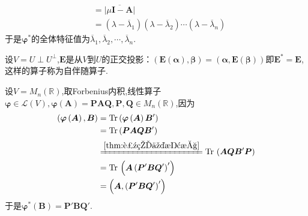 \begin{formal}
\begin{Proof}
\begin{enumerate}[label={\textup{(\arabic*)}}]
\begin{align*}
                &=\overline{
                    \left|
                        \mu\bm{I}-\bm{A}
                    \right|
                }\\
                &=\left(
                    \lambda-\overline{\lambda}_1
                \right)\left(
                    \lambda-\overline{\lambda}_2
                \right)\cdots\left(
                    \lambda-\overline{\lambda}_n
                \right)
            \end{align*}于是$\bm{\varphi}^*$的全体特征值为$\overline{\lambda}_1,\overline{\lambda}_2,\cdots,\overline{\lambda}_n$.\qedhere
        \end{enumerate}
    \end{Proof}
\end{formal}
\begin{brown}
    \begin{example}
        设$V=U\perp U^{\perp}$,$\bm{E}$是从$V$到$U$的正交投影：$\left(\bm{E}\left(\bm{\alpha}\right),\bm{\beta}\right)=\left(\bm{\alpha},\bm{E}\left(\bm{\beta}\right)\right)$即$\bm{E}^*=\bm{E}$,这样的算子称为自伴随算子.
    \end{example}
\end{brown}
\begin{brown}
    \begin{example}
        设$V=M_n\left(\mathbb{R}\right)$,取\textup{Forbenius}内积,线性算子$\bm{\varphi}\in\mathcal{L}\left(V\right),\bm{\varphi}\left(\bm{A}\right)=\bm{PAQ},\bm{P},\bm{Q}\in M_n\left(\mathbb{R}\right)$,因为\begin{align*}
            \left(
                \bm{\varphi}\left(\bm{A}\right),\bm{B}
            \right)&=\mathrm{Tr}\left(
                \bm{\varphi}\left(\bm{A}\right)\bm{B}'
            \right)\\
            &=\mathrm{Tr}\left(
                \bm{PAQ}\bm{B}'
            \right)\\
            &\xlongequal{\cref{thm:迹的交换性}}\mathrm{Tr}\,\left(
                \bm{AQB}'\bm{P}
            \right)\\
            &=\mathrm{Tr}\,\left(\bm{A}\left(\bm{P}'\bm{B}\bm{Q}'\right)'\right)\\
            &=\left(
                \bm{A},\left(
                    \bm{P}'\bm{B}\bm{Q}'
                \right)'
            \right)
        \end{align*}于是$\bm{\varphi}^*\left(\bm{B}\right)=\bm{P}'\bm{BQ}'$.
    \end{example}
\end{brown}
\newpage
